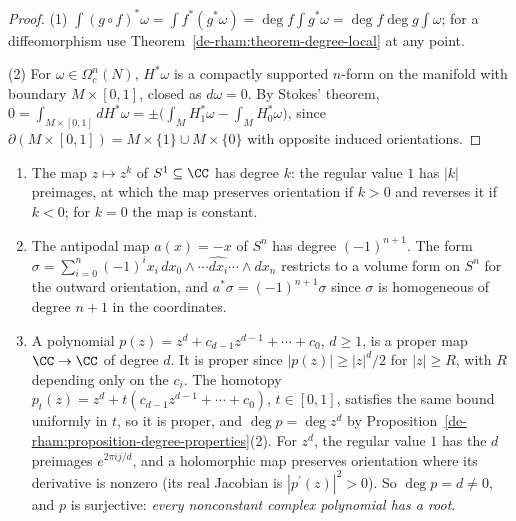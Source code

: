 \begin{proof}
(1) $\int(g \circ f)^*\omega = \int f^*(g^*\omega) = \deg f\int g^*\omega = \deg f\deg g\int\omega$; for a diffeomorphism use Theorem~\ref{de-rham:theorem-degree-local} at any point.

(2) For $\omega \in \Omega^n_c(N)$, $H^*\omega$ is a compactly supported $n$-form on the manifold with boundary $M \times [0, 1]$, closed as $d\omega = 0$. By Stokes' theorem,
$0 = \int_{M \times [0, 1]}dH^*\omega = \pm\bigl(\int_MH_1^*\omega - \int_MH_0^*\omega\bigr)$, since $\partial(M \times [0, 1]) = M \times \{1\} \cup M \times \{0\}$ with opposite induced orientations.
\end{proof}

\begin{example}\label{de-rham:example-degrees}
\begin{enumerate}
\item The map $z \mapsto z^k$ of $S^1 \subseteq \CC$ has degree $k$: the regular value $1$ has $|k|$ preimages, at which the map preserves orientation if $k > 0$ and reverses it if $k < 0$; for $k = 0$ the map is constant.
\item The antipodal map $a(x) = -x$ of $S^n$ has degree $(-1)^{n+1}$. The form $\sigma = \sum_{i=0}^n(-1)^ix_i\,dx_0 \wedge \cdots \widehat{dx_i} \cdots \wedge dx_n$ restricts to a volume form on $S^n$ for the outward orientation, and
$a^*\sigma = (-1)^{n+1}\sigma$ since $\sigma$ is homogeneous of degree $n + 1$ in the coordinates.
\item A polynomial $p(z) = z^d + c_{d-1}z^{d-1} + \cdots + c_0$, $d \geq 1$, is a proper map $\CC \to \CC$ of degree $d$. It is proper since $|p(z)| \geq |z|^d/2$ for $|z| \geq R$, with $R$ depending only on the $c_i$. The homotopy
$p_t(z) = z^d + t(c_{d-1}z^{d-1} + \cdots + c_0)$, $t \in [0, 1]$, satisfies the same bound uniformly in $t$, so it is proper, and $\deg p = \deg z^d$ by Proposition~\ref{de-rham:proposition-degree-properties}(2). For $z^d$, the regular value $1$ has the $d$
preimages $e^{2\pi ij/d}$, and a holomorphic map preserves orientation where its derivative is nonzero (its real Jacobian is $|p^{\prime}(z)|^2 > 0$). So $\deg p = d \neq 0$, and $p$ is surjective: \emph{every nonconstant complex polynomial has a root}.
\end{enumerate}
\end{example}

